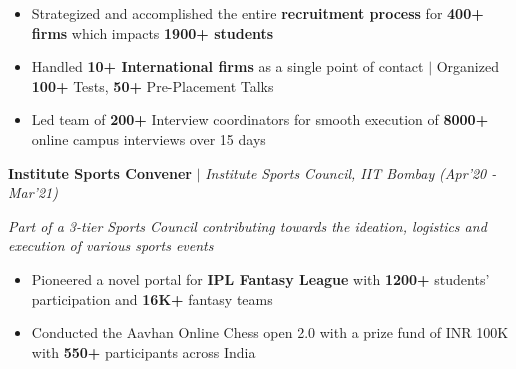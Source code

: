 \documentclass[10pt]{article}
\begin{document}
	\begin{itemize}[label={\textbullet},itemsep = -0.8 mm, leftmargin=*]
        \item Strategized and accomplished the entire \textbf{recruitment process} for \textbf{400+ firms} which impacts \textbf{1900+ students}
         \item Handled \textbf{10+ International firms} as a single point of contact $|$ Organized \textbf{100+} Tests, \textbf{50+} Pre-Placement Talks 
         \item Led team of \textbf{200+} Interview coordinators for smooth execution of \textbf{8000+} online campus interviews over 15 days

\end{itemize}
\vspace{-6pt}
\textbf{Institute Sports Convener} $|$ \textit{Institute Sports Council, IIT Bombay} \hfill{\sl \small (Apr’20 - Mar’21)}  \\
	 \vspace{-0.3cm}
 \hline 
 \vspace{-4pt}
 \begin{flushleft}
 	\textit{Part of a 3-tier Sports Council contributing towards the ideation, logistics and execution of various sports events}\\
 \end{flushleft}
 \vspace{-14pt}

	\begin{itemize}[label={\textbullet},itemsep = -0.8 mm, leftmargin=*]
        \item Pioneered a novel portal for \textbf{IPL Fantasy League} with \textbf{1200+} students’ participation and \textbf{16K+} fantasy teams 
        \item Conducted the Aavhan Online Chess open 2.0 with a prize fund of INR 100K with \textbf{550+} participants across India
        

\end{itemize}
\end{document}
